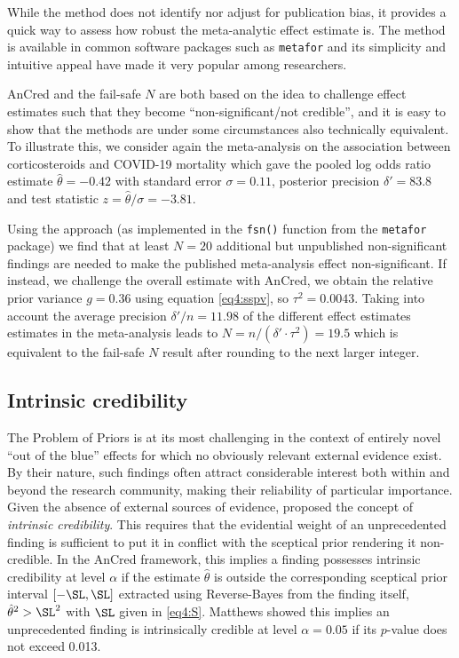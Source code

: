 While the method does not identify nor adjust for publication bias, it provides
a quick way to assess how robust the meta-analytic effect estimate is. The
method is available in common software packages such as \texttt{metafor}
\citep{Viechtbauer2010} and its simplicity and intuitive appeal have made it
very popular among researchers.



AnCred and the fail-safe $N$ are both based on the idea to challenge effect
estimates such that they become ``non-significant/not credible'', and it is easy
to show that the methods are under some circumstances also technically
equivalent. To illustrate this, we consider again the meta-analysis on the
association between corticosteroids and COVID-19 mortality \citep{REACT2020}
which gave the pooled log odds ratio estimate $\hat \theta = -0.42$ with
standard error $\sigma = 0.11$, posterior precision $\delta'=83.8$ and test
statistic $z=\hat \theta/\sigma= -3.81$.


Using the \citet{Rosenberg2005} approach (as implemented in the \texttt{fsn()}
function from the \texttt{metafor} package) we find that at least $N = 20$
additional but unpublished non-significant findings are needed to make the
published meta-analysis effect non-significant. If instead, we challenge the
overall estimate with AnCred, we obtain the relative prior variance $g = 0.36$
using equation \eqref{eq4:sspv}, so $\tau^2 = 0.0043$. Taking into account the
average precision $\delta' / n = 11.98$ of the different effect estimates
estimates in the meta-analysis leads to ${N} = n/(\delta' \cdot \tau^2) = 19.5$
which is equivalent to the fail-safe $N$ result after rounding to the next
larger integer.


\subsection{Intrinsic credibility}
\label{sec4:IC}

The Problem of Priors is at its most challenging in the context of entirely
novel ``out of the blue'' effects for which no obviously relevant external
evidence exist. By their nature, such findings often attract considerable
interest both within and beyond the research community, making their reliability
of particular importance. Given the absence of external sources of evidence,
\citet{Matthews2018} proposed the concept of \emph{intrinsic
  credibility}. This requires that the evidential weight of an unprecedented
finding is sufficient to put it in conflict with the sceptical prior rendering
it non-credible. In the AnCred framework, this implies a finding possesses
intrinsic credibility at level $\alpha$ if the estimate $\hat{\theta}$ is
outside the corresponding sceptical prior interval $[-\SL, \SL]$ extracted using
Reverse-Bayes from the finding itself, \ie{} $\hat{\theta}^2 > \SL^2$ with $\SL$
given in \eqref{eq4:S}. Matthews showed this implies an unprecedented finding is
intrinsically credible at level $\alpha=0.05$ if its $p$-value does not exceed
0.013.

